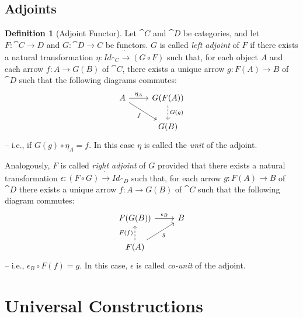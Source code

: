 \documentclass[a4paper, twoside,openright]{report}
\theoremstyle{plain}
\theoremstyle{definition}
\newtheorem{definition}[theorem]{Definition}
\begin{document}
\subsection{Adjoints}

\begin{definition}[Adjoint Functor]\label{def:adjoint}
    Let $\cat C$ and $\cat D$ be categories, and let $F:\cat{C \rightarrow D}$ and $G : \cat{D \rightarrow C}$ be functors. $G$ is called \emph{left adjoint} of $F$ if there exists a natural transformation $\eta: Id_{\cat C} \dot\rightarrow (G \circ F)$ such that, for each object $A$ and each arrow $f: A \rightarrow G(B)$ of $\cat C$, there exists a unique arrow $g: F(A) \rightarrow B$ of $\cat D$ such that the following diagrams commutes:
    \[
        \begin{tikzcd}
            A \arrow[r, "{\eta_A}"] \arrow[dr, "f" swap] & G(F(A)) \arrow[d, dashed, "G(g)"] \\
            & G(B)
        \end{tikzcd}
    \] -- i.e., if $G(g) \circ \eta_{A} = f$. In this case $\eta$ is called the \emph{unit} of the adjoint.

    Analogously, $F$ is called \emph{right adjoint} of $G$ provided that there exists a natural transformation $\epsilon : (F \circ G) \dot\rightarrow Id_{\cat D}$ such that, for each arrow $g: F(A) \rightarrow B$ of $\cat D$ there exists a unique arrow $f: A \rightarrow G(B)$ of $\cat C$ such that the following diagram commutes:
    \[
        \begin{tikzcd}
            F(G(B)) \arrow[r, "{\epsilon_{B}}"] & B \\
            F(A) \arrow[u, dashed, "F(f)"] \arrow[ur, "g"swap] 
        \end{tikzcd}
    \] -- i.e., $\epsilon_{B} \circ F(f) = g$. In this case, $\epsilon$ is called \emph{co-unit} of the adjoint.
\end{definition}


\section{Universal Constructions}\label{sect:univ_constr}

\end{document}
